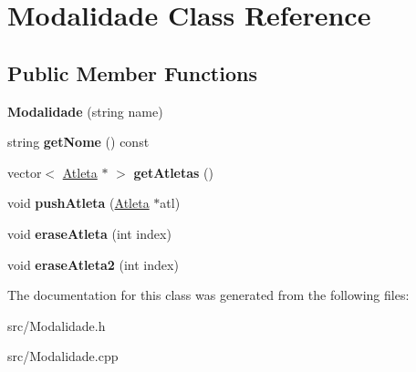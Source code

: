 \hypertarget{class_modalidade}{}\section{Modalidade Class Reference}
\label{class_modalidade}
\subsection*{Public Member Functions}
\begin{DoxyCompactItemize}
\item 
\hypertarget{class_modalidade_aceeb2517503ed5dcb712890b280b9194}{}{\bfseries Modalidade} (string name)\label{class_modalidade_aceeb2517503ed5dcb712890b280b9194}

\item 
\hypertarget{class_modalidade_a46003f6a0dceac894f92971a6df9e4a7}{}string {\bfseries get\+Nome} () const \label{class_modalidade_a46003f6a0dceac894f92971a6df9e4a7}

\item 
\hypertarget{class_modalidade_a259ad3d7e3ba08a6167a632d1e216554}{}vector$<$ \hyperlink{class_atleta}{Atleta} $\ast$ $>$ {\bfseries get\+Atletas} ()\label{class_modalidade_a259ad3d7e3ba08a6167a632d1e216554}

\item 
\hypertarget{class_modalidade_ab1db62f8b54f8cec37ea2aa1ed2711a1}{}void {\bfseries push\+Atleta} (\hyperlink{class_atleta}{Atleta} $\ast$atl)\label{class_modalidade_ab1db62f8b54f8cec37ea2aa1ed2711a1}

\item 
\hypertarget{class_modalidade_ab93a5e17e9b85eb496ce7c82229e879a}{}void {\bfseries erase\+Atleta} (int index)\label{class_modalidade_ab93a5e17e9b85eb496ce7c82229e879a}

\item 
\hypertarget{class_modalidade_a39da8a6a7ed0009f6f2965db0001d85d}{}void {\bfseries erase\+Atleta2} (int index)\label{class_modalidade_a39da8a6a7ed0009f6f2965db0001d85d}

\end{DoxyCompactItemize}


The documentation for this class was generated from the following files\+:\begin{DoxyCompactItemize}
\item 
src/Modalidade.\+h\item 
src/Modalidade.\+cpp\end{DoxyCompactItemize}
